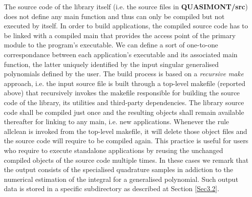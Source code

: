 \documentclass[a4paper, twosided]{book}
\begin{document}
\vspace{0.25cm}

\noindent
The source code of the library itself (i.e. the source files in \colorbox{poliGrayBlue}{\textbf{QUASIMONT/src}}) does not define any \colorbox{poliGrayBlue}{main} function and thus can only be compiled but not executed by itself. In order to build applications, the compiled source code has to be linked with a compiled \colorbox{poliGrayBlue}{main} that provides the access point of the primary module to the program's executable. We can define a sort of one-to-one correspondance between each application's executable and its associated \colorbox{poliGrayBlue}{main} function, the latter uniquely identified by the input singular generalised polynomials defined by the user. The build process is based on a \textsl{recursive make} approach, i.e. the input source file is built through a top-level \colorbox{poliGrayBlue}{makefile} (reported above) that recursively invokes the \colorbox{poliGrayBlue}{makefile} responsible for building the source code of the library, its utilities and third-party dependencies. The library source code shall be compiled just once and the resulting objects shall remain available thereafter for linking to any \colorbox{poliGrayBlue}{main}, i.e. new applications. Whenever the rule \colorbox{poliGrayBlue}{allclean} is invoked from the top-level \colorbox{poliGrayBlue}{makefile}, it will delete those object files and the source code will require to be compiled again. This practice is useful for users who require to execute standalone applications by reusing the unchanged compiled objects of the source code multiple times. In these cases we remark that the output consists of the specialised quadrature samples in addiction to the numerical estimation of the integral for a generalised polynomial. Such output data is stored in a specific subdirectory as described at Section \ref{Sec3.2}.
\end{document}
